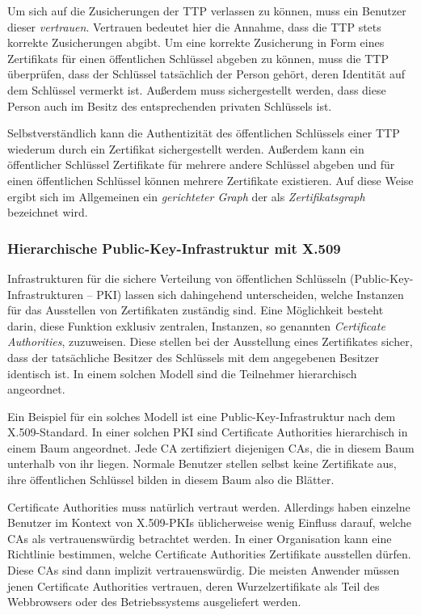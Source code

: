 Um sich auf die Zusicherungen der TTP verlassen zu können, muss ein
Benutzer dieser \emph{vertrauen}. Vertrauen bedeutet hier die Annahme,
dass die TTP stets korrekte Zusicherungen abgibt. Um eine korrekte
Zusicherung in Form eines Zertifikats für einen öffentlichen
Schlüssel abgeben zu können, muss die TTP überprüfen, dass der
Schlüssel tatsächlich der Person gehört, deren Identität auf
dem Schlüssel vermerkt ist. Außerdem muss sichergestellt werden,
dass diese Person auch im Besitz des entsprechenden privaten
Schlüssels ist.

Selbstverständlich kann die Authentizität des öffentlichen
Schlüssels einer TTP wiederum durch ein Zertifikat sichergestellt
werden. Außerdem kann ein öffentlicher Schlüssel Zertifikate
für mehrere andere Schlüssel abgeben und für einen
öffentlichen Schlüssel können mehrere Zertifikate
existieren. Auf diese Weise ergibt sich im Allgemeinen ein
\emph{gerichteter Graph} der als \emph{Zertifikatsgraph} bezeichnet
wird.

\subsubsection{Hierarchische Public-Key-Infrastruktur mit X.509}
\label{ch:Grundlagen:sec:PublicKeyCrypto:subsec:KeyAuth:subsubsec:PKI}

Infrastrukturen für die sichere Verteilung von öffentlichen
Schlüsseln (Public-Key-Infrastrukturen -- PKI) lassen sich
dahingehend unterscheiden, welche Instanzen für das Ausstellen von
Zertifikaten zuständig sind. Eine Möglichkeit besteht darin, diese
Funktion exklusiv zentralen, Instanzen, so genannten \emph{Certificate
  Authorities}, zuzuweisen. Diese stellen bei der Ausstellung eines
Zertifikates sicher, dass der tatsächliche Besitzer des Schlüssels
mit dem angegebenen Besitzer identisch ist. In einem solchen Modell
sind die Teilnehmer hierarchisch angeordnet. 

Ein Beispiel für ein solches Modell ist eine
Public-Key-Infrastruktur nach dem X.509-Standard. In einer solchen PKI
sind Certificate Authorities hierarchisch in einem Baum
angeordnet. Jede CA zertifiziert diejenigen CAs, die in diesem Baum
unterhalb von ihr liegen. Normale Benutzer stellen selbst keine Zertifikate
aus, ihre öffentlichen Schlüssel bilden in diesem Baum also die
Blätter.

Certificate Authorities muss natürlich vertraut werden. Allerdings
haben einzelne Benutzer im Kontext von X.509-PKIs üblicherweise
wenig Einfluss darauf, welche CAs als vertrauenswürdig betrachtet
werden. In einer Organisation kann eine Richtlinie bestimmen, welche
Certificate Authorities Zertifikate ausstellen dürfen. Diese CAs sind
dann implizit vertrauenswürdig. Die meisten Anwender müssen jenen
Certificate Authorities vertrauen, deren Wurzelzertifikate als Teil
des Webbrowsers oder des Betriebssystems ausgeliefert werden.

